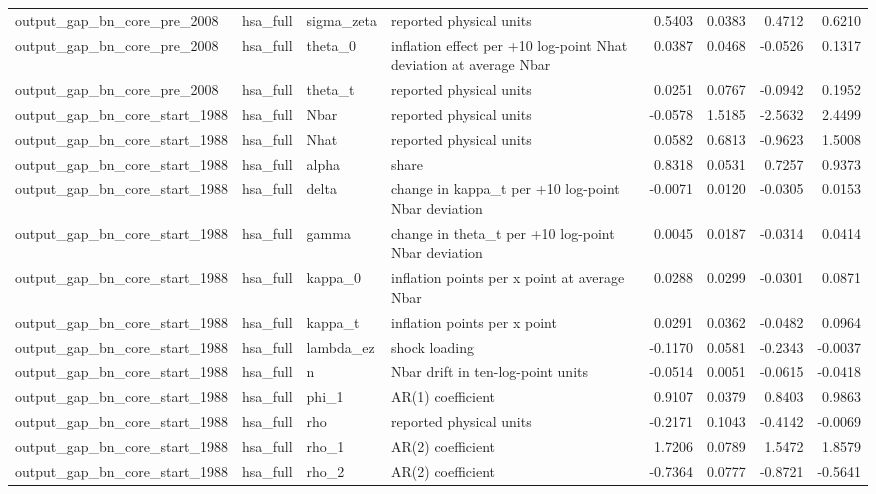\begin{tabular}{llllrrrr}
output\_gap\_bn\_core\_pre\_2008 & hsa\_full & sigma\_zeta & reported physical units & 0.5403 & 0.0383 & 0.4712 & 0.6210 \\
output\_gap\_bn\_core\_pre\_2008 & hsa\_full & theta\_0 & inflation effect per +10 log-point Nhat deviation at average Nbar & 0.0387 & 0.0468 & -0.0526 & 0.1317 \\
output\_gap\_bn\_core\_pre\_2008 & hsa\_full & theta\_t & reported physical units & 0.0251 & 0.0767 & -0.0942 & 0.1952 \\
output\_gap\_bn\_core\_start\_1988 & hsa\_full & Nbar & reported physical units & -0.0578 & 1.5185 & -2.5632 & 2.4499 \\
output\_gap\_bn\_core\_start\_1988 & hsa\_full & Nhat & reported physical units & 0.0582 & 0.6813 & -0.9623 & 1.5008 \\
output\_gap\_bn\_core\_start\_1988 & hsa\_full & alpha & share & 0.8318 & 0.0531 & 0.7257 & 0.9373 \\
output\_gap\_bn\_core\_start\_1988 & hsa\_full & delta & change in kappa\_t per +10 log-point Nbar deviation & -0.0071 & 0.0120 & -0.0305 & 0.0153 \\
output\_gap\_bn\_core\_start\_1988 & hsa\_full & gamma & change in theta\_t per +10 log-point Nbar deviation & 0.0045 & 0.0187 & -0.0314 & 0.0414 \\
output\_gap\_bn\_core\_start\_1988 & hsa\_full & kappa\_0 & inflation points per x point at average Nbar & 0.0288 & 0.0299 & -0.0301 & 0.0871 \\
output\_gap\_bn\_core\_start\_1988 & hsa\_full & kappa\_t & inflation points per x point & 0.0291 & 0.0362 & -0.0482 & 0.0964 \\
output\_gap\_bn\_core\_start\_1988 & hsa\_full & lambda\_ez & shock loading & -0.1170 & 0.0581 & -0.2343 & -0.0037 \\
output\_gap\_bn\_core\_start\_1988 & hsa\_full & n & Nbar drift in ten-log-point units & -0.0514 & 0.0051 & -0.0615 & -0.0418 \\
output\_gap\_bn\_core\_start\_1988 & hsa\_full & phi\_1 & AR(1) coefficient & 0.9107 & 0.0379 & 0.8403 & 0.9863 \\
output\_gap\_bn\_core\_start\_1988 & hsa\_full & rho & reported physical units & -0.2171 & 0.1043 & -0.4142 & -0.0069 \\
output\_gap\_bn\_core\_start\_1988 & hsa\_full & rho\_1 & AR(2) coefficient & 1.7206 & 0.0789 & 1.5472 & 1.8579 \\
output\_gap\_bn\_core\_start\_1988 & hsa\_full & rho\_2 & AR(2) coefficient & -0.7364 & 0.0777 & -0.8721 & -0.5641 \\

\end{tabular}
